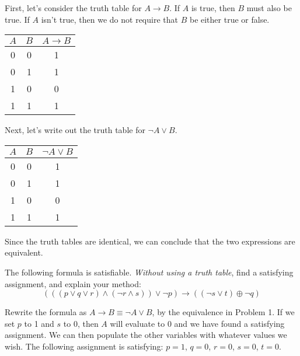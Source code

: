 \documentclass[solution, letterpaper]{cs20inclass}
\begin{document}
\begin{solution}
  First, let's consider the truth table for $A \rightarrow B$. If $A$ is true, then $B$ must also be true. If $A$ isn't true, then we do not require that $B$ be either true or false.
  \begin{center}
    \begin{tabular}{|c|c|c|}\hline
      $A$ & $B$ & $A \rightarrow B$ \\\hline
      0 & 0 & 1 \\
      0 & 1 & 1 \\
      1 & 0 & 0 \\
      1 & 1 & 1 \\\hline
    \end{tabular}
  \end{center}
  
  Next, let's write out the truth table for $\lnot A \lor B$.
  \begin{center}
    \begin{tabular}{|c|c|c|}\hline
      $A$ & $B$ & $\lnot A \lor B$ \\\hline
      0 & 0 & 1 \\
      0 & 1 & 1 \\
      1 & 0 & 0 \\
      1 & 1 & 1 \\\hline
    \end{tabular}
  \end{center}
  
  Since the truth tables are identical, we can conclude that the two expressions are equivalent.
  
\end{solution}

\problem

The following formula is satisfiable.  \emph{Without using a truth table}, find a satisfying assignment, and explain your method:
	$$(((p \lor q \lor r) \land (\neg r \land s)) \lor \neg p) \rightarrow ((\neg s \lor t) \oplus \neg q) $$

\begin{solution}
Rewrite the formula as $A \rightarrow B \equiv \lnot A \lor B$, by the equivalence in Problem 1. If we set $p$ to 1 and $s$ to 0, then $A$ will evaluate to 0 and we have found a satisfying assignment. We can then populate the other variables with whatever values we wish. The following assignment is satisfying: $p = 1$, $q = 0$, $r = 0$, $s = 0$, $t = 0$.
\end{solution}
\end{document}
